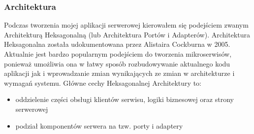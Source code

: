 \subsubsection{Architektura}
Podczas tworzenia mojej aplikacji serwerowej kierowałem się podejściem zwanym Architekturą Heksagonalną (lub Architektura Portów i Adapterów).
Architektura Heksagonalna została udokumentowana przez Alistaira Cockburna w 2005. Aktualnie jest bardzo popularnym podejściem do tworzenia mikroserwisów, ponieważ umożliwia ona w łatwy sposób rozbudowywanie aktualnego kodu aplikacji jak i wprowadzanie zmian wynikających ze zmian w architekturze i wymagań systemu.
Główne cechy Heksagonalnej Architektury to:
\begin{itemize}
  \item oddzielenie części obsługi klientów serwisu, logiki biznesowej oraz strony serwerowej
  \item podział komponentów serwera na tzw. porty i adaptery
\end{itemize}

